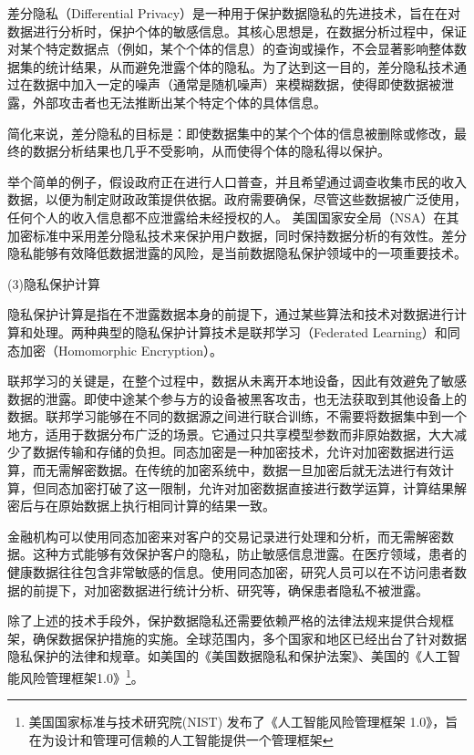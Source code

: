 差分隐私（Differential Privacy）是一种用于保护数据隐私的先进技术，旨在在对数据进行分析时，保护个体的敏感信息。其核心思想是，在数据分析过程中，保证对某个特定数据点（例如，某个个体的信息）的查询或操作，不会显著影响整体数据集的统计结果，从而避免泄露个体的隐私。为了达到这一目的，差分隐私技术通过在数据中加入一定的噪声（通常是随机噪声）来模糊数据，使得即使数据被泄露，外部攻击者也无法推断出某个特定个体的具体信息。

简化来说，差分隐私的目标是：即使数据集中的某个个体的信息被删除或修改，最终的数据分析结果也几乎不受影响，从而使得个体的隐私得以保护。

举个简单的例子，假设政府正在进行人口普查，并且希望通过调查收集市民的收入数据，以便为制定财政政策提供依据。政府需要确保，尽管这些数据被广泛使用，任何个人的收入信息都不应泄露给未经授权的人。
美国国家安全局（NSA）在其加密标准中采用差分隐私技术来保护用户数据，同时保持数据分析的有效性。差分隐私能够有效降低数据泄露的风险，是当前数据隐私保护领域中的一项重要技术。

(3)隐私保护计算

隐私保护计算是指在不泄露数据本身的前提下，通过某些算法和技术对数据进行计算和处理。两种典型的隐私保护计算技术是联邦学习（Federated Learning）和同态加密（Homomorphic Encryption）。

联邦学习的关键是，在整个过程中，数据从未离开本地设备，因此有效避免了敏感数据的泄露。即使中途某个参与方的设备被黑客攻击，也无法获取到其他设备上的数据。联邦学习能够在不同的数据源之间进行联合训练，不需要将数据集中到一个地方，适用于数据分布广泛的场景。它通过只共享模型参数而非原始数据，大大减少了数据传输和存储的负担。同态加密是一种加密技术，允许对加密数据进行运算，而无需解密数据。在传统的加密系统中，数据一旦加密后就无法进行有效计算，但同态加密打破了这一限制，允许对加密数据直接进行数学运算，计算结果解密后与在原始数据上执行相同计算的结果一致。

金融机构可以使用同态加密来对客户的交易记录进行处理和分析，而无需解密数据。这种方式能够有效保护客户的隐私，防止敏感信息泄露。在医疗领域，患者的健康数据往往包含非常敏感的信息。使用同态加密，研究人员可以在不访问患者数据的前提下，对加密数据进行统计分析、研究等，确保患者隐私不被泄露。

除了上述的技术手段外，保护数据隐私还需要依赖严格的法律法规来提供合规框架，确保数据保护措施的实施。全球范围内，多个国家和地区已经出台了针对数据隐私保护的法律和规章。如美国的《美国数据隐私和保护法案》、美国的《人工智能风险管理框架1.0》\footnote{美国国家标准与技术研究院(NIST) 发布了《人工智能风险管理框架 1.0》，旨在为设计和管理可信赖的人工智能提供一个管理框架}。

